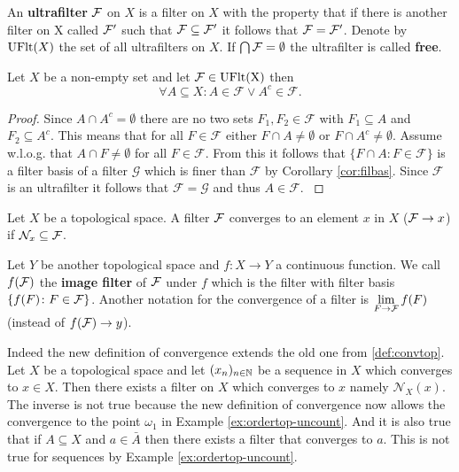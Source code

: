 \begin{defin} 
  An \textbf{ultrafilter} $\mathcal{F}$ on $X$ is a filter on $X$ with the property that if there is another filter on X called $\mathcal{F}'$ such that $\mathcal{F} \subseteq \mathcal{F}'$ it follows that $\mathcal{F} = \mathcal{F}'$. Denote by ${\rm UFlt}(X)$ the set of all ultrafilters on $X$.
  If $\bigcap \mathcal{F} = \emptyset$ the ultrafilter is called \textbf{free}.
\end{defin}

\begin{lemma}\label{lem:ufltlemma}
  Let $X$ be a non-empty set and let $\mathcal{F} \in {\rm UFlt(X)}$ then
  \begin{equation*}
    \forall A \subseteq X\colon A \in \mathcal{F} \lor A^c \in \mathcal{F}.
  \end{equation*}
\end{lemma}

\begin{proof}
  Since $A \cap A^c = \emptyset$ there are no two sets $F_1, F_2 \in \mathcal{F}$ with $F_1 \subseteq A$ and $F_2 \subseteq A^c$. This means that for all $F \in \mathcal{F}$ either $F \cap A \neq \emptyset$ or $F \cap A^c \neq \emptyset$. Assume w.l.o.g. that $A \cap F \neq \emptyset$ for all $F \in \mathcal{F}$. From this it follows that $\{F \cap A\colon F\in \mathcal{F}\}$ is a filter basis of a filter $\mathcal{G}$ which is finer than $\mathcal{F}$ by Corollary \ref{cor:filbas}. Since $\mathcal{F}$ is an ultrafilter it follows that $\mathcal{F} = \mathcal{G}$ and thus $A \in \mathcal{F}$. \cite[5.12 Satz]{BvQMT}
\end{proof}

\begin{defin}
  Let $X$ be a topological space. A filter $\mathcal{F}$ converges to an element $x$ in $X$ ($\mathcal{F} \to x$) if $\mathcal{N}_x \subseteq \mathcal{F}$. 
  
  Let $Y$ be another topological space and $f: X \to Y$ a continuous function. 
  We call $f(\mathcal{F})$ the \textbf{image filter} of $\mathcal{F}$ under $f$ which is the filter with filter basis $\{f(F)\colon F \in \mathcal{F}\}$. Another notation for the convergence of a filter is $\lim\limits_{F\to\mathcal{F}}f(F)$ (instead of $f(\mathcal{F}) \to y$).
\end{defin}

Indeed the new definition of convergence extends the old one from \ref{def:convtop}. Let $X$ be a topological space and let $(x_n)_{n\in\mathbb{N}}$ be a sequence in $X$ which converges to $x \in X$. Then there exists a filter on $X$ which converges to $x$ namely $\mathcal{N}_X(x)$. The inverse is not true because the new definition of convergence now allows the convergence to the point $\omega_1$ in Example \ref{ex:ordertop-uncount}. And it is also true that if $A \subseteq X$ and $a \in \bar{A}$ then there exists a filter that converges to $a$. This is not true for sequences by Example \ref{ex:ordertop-uncount}.

